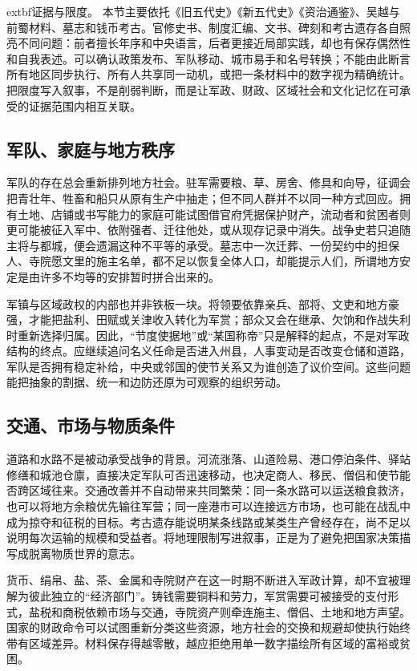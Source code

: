 \noindent	extbf{证据与限度。} 本节主要依托《旧五代史》《新五代史》《资治通鉴》、吴越与前蜀材料、墓志和钱币考古。官修史书、制度汇编、文书、碑刻和考古遗存各自照亮不同问题：前者擅长年序和中央语言，后者更接近局部实践，却也有保存偶然性和自我表述。可以确认政策发布、军队移动、城市易手和名号转换；不能由此断言所有地区同步执行、所有人共享同一动机，或把一条材料中的数字视为精确统计。把限度写入叙事，不是削弱判断，而是让军政、财政、区域社会和文化记忆在可承受的证据范围内相互关联。

\subsection{军队、家庭与地方秩序}
军队的存在总会重新排列地方社会。驻军需要粮、草、房舍、修具和向导，征调会把青壮年、牲畜和船只从原有生产中抽走；但不同人群并不以同一种方式回应。拥有土地、店铺或书写能力的家庭可能试图借官府凭据保护财产，流动者和贫困者则更可能被征入军中、依附强者、迁往他处，或从现存记录中消失。战争史若只追随主将与都城，便会遗漏这种不平等的承受。墓志中一次迁葬、一份契约中的担保人、寺院愿文里的施主名单，都不足以恢复全体人口，却能提示人们，所谓地方安定是由许多不均等的安排暂时拼合出来的。

军镇与区域政权的内部也并非铁板一块。将领要依靠亲兵、部将、文吏和地方豪强，才能把盐利、田赋或关津收入转化为军赏；部众又会在继承、欠饷和作战失利时重新选择归属。因此，“节度使据地”或“某国称帝”只是解释的起点，不是对军政结构的终点。应继续追问名义任命是否进入州县，人事变动是否改变仓储和道路，军队是否拥有稳定补给，中央或邻国的使节关系又为谁创造了议价空间。这些问题能把抽象的割据、统一和边防还原为可观察的组织劳动。

\subsection{交通、市场与物质条件}
道路和水路不是被动承受战争的背景。河流涨落、山道险易、港口停泊条件、驿站修缮和城池仓廪，直接决定军队可否迅速移动，也决定商人、移民、僧侣和使节能否跨区域往来。交通改善并不自动带来共同繁荣：同一条水路可以运送粮食救济，也可以将地方余粮优先输往军营；同一座港市可以连接远方市场，也可能在战乱中成为掠夺和征税的目标。考古遗存能说明某条线路或某类生产曾经存在，尚不足以说明每次运输的规模和受益者。将地理限制写进叙事，正是为了避免把国家决策描写成脱离物质世界的意志。

货币、绢帛、盐、茶、金属和寺院财产在这一时期不断进入军政计算，却不宜被理解为彼此独立的“经济部门”。铸钱需要铜料和劳力，军赏需要可被接受的支付形式，盐税和商税依赖市场与交通，寺院资产则牵连施主、僧侣、土地和地方声望。国家的财政命令可以试图重新分类这些资源，地方社会的交换和规避却使执行始终带有区域差异。材料保存得越零散，越应拒绝用单一数字描绘所有区域的富裕或贫困。


